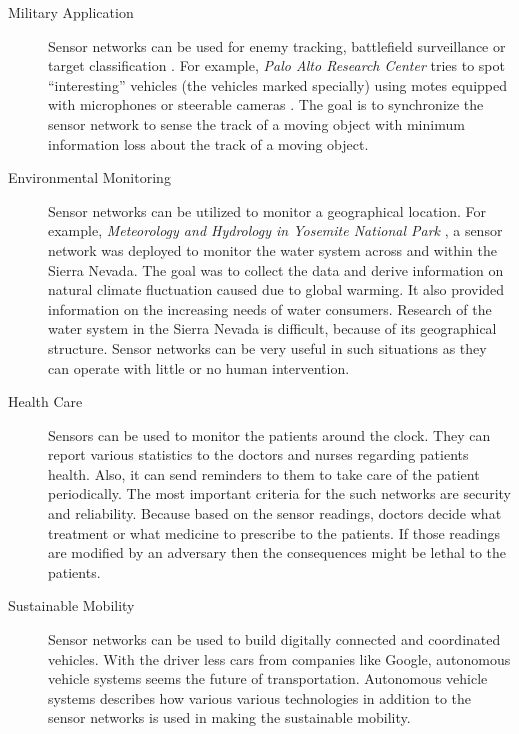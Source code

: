 	\begin{description}
		\item[Military Application]
			Sensor networks can be used for enemy tracking, battlefield surveillance or target classification \cite{li2002detection}.
			For example, \textit{Palo Alto Research Center} tries to spot ``interesting'' vehicles (the vehicles marked specially) using motes equipped with microphones or steerable cameras \cite{chu2004distributed}.
			The goal is to synchronize the sensor network to sense the track of a moving object with minimum information loss about the track of a moving object.

		\item[Environmental Monitoring] 
			Sensor networks can be utilized to monitor a geographical location. 
			For example, \textit{Meteorology and Hydrology in Yosemite National Park} \cite{lundquist2003meteorology}, a sensor network was deployed to monitor the water system across and within the Sierra Nevada.
			The goal was to collect the data and derive information on natural climate fluctuation caused due to global warming.
			It also provided information on the increasing needs of water consumers.
			Research of the water system in the Sierra Nevada is difficult, because of its geographical structure.
			Sensor networks can be very useful in such situations as they can operate with little or no human intervention.
		
		\item[Health Care]
			Sensors can be used to monitor the patients around the clock. 
			They can report various statistics to the doctors and nurses regarding patients health.
			Also, it can send reminders to them to take care of the patient periodically. 	
			The most important criteria for the such networks are security and reliability.
			Because based on the sensor readings, doctors decide what treatment or what medicine to prescribe to the patients.
			If those readings are modified by an adversary then the consequences might be lethal to the patients.

		\item[Sustainable Mobility]
			Sensor networks can be used to build digitally connected and coordinated vehicles.
			With the driver less cars from companies like Google, autonomous vehicle systems seems the future of transportation.
			Autonomous vehicle systems \cite{benenson2008towards} describes how various various technologies in addition to the sensor networks is used in making the sustainable mobility.
		

\end{description}
